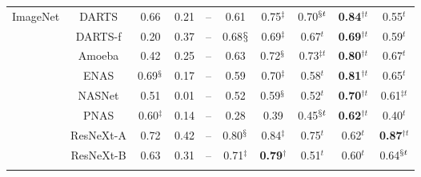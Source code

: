 \documentclass{article}
\begin{document}
\begin{table}[t]
{\begin{tabular}{lcccc|ccccc}
\hline

ImageNet & DARTS & 0.66 & 0.21 & -- &0.61 & {0.75$^\ddagger$} & {0.70$^{\mathsection t}$} & {\textbf{0.84$^{\dagger t}$}} & 0.55$^{t}$ \\
 & DARTS-f & 0.20 & 0.37 & --  &{0.68$\mathsection$} & {0.69$^\ddagger$} & 0.67$^{t}$ & {\textbf{0.69$^{\dagger t}$}} &  0.59$^{t}$ \\
 & Amoeba & 0.42 & 0.25 & -- & 0.63 & {0.72$^\mathsection$} & {0.73$^{\ddagger t}$} &  {\textbf{0.80$^{\dagger t}$}} & 0.67$^{t}$ \\
 & ENAS & {0.69$^\mathsection$} & 0.17 & -- &0.59 & {0.70$^\ddagger$} & 0.58$^{t}$ & {\textbf{0.81$^{\dagger t}$}} & {0.65$^{t}$} \\
 & NASNet & 0.51 & 0.01 & -- &0.52 &  {0.59$^\mathsection$} & 0.52$^{t}$ &  {\textbf{0.70$^{\dagger t}$}} & {0.61$^{\ddagger t}$} \\
 & PNAS & {0.60$^\ddagger$} & 0.14 & -- & 0.28 & 0.39 & {0.45$^{\mathsection t}$} & {\textbf{0.62$^{\dagger t}$}} & 0.40$^{t}$ \\
 & ResNeXt-A & 0.72 & 0.42 & -- & {0.80$^\mathsection$}& {0.84$^\ddagger$}& 0.75$^{t}$ & 0.62$^{t}$ & {\textbf{0.87$^{\dagger t}$}} \\
 & ResNeXt-B & 0.63 & 0.31 & -- & {0.71$^\ddagger$}& {\textbf{0.79}$^\dagger$} & 0.51$^{t}$ & 0.60$^{t}$ & {0.64$^{\mathsection t}$} \\
\Xhline{0.8pt}
\end{tabular}}
 \vspace{-14pt}
\end{table}
\normalsize{}


\vspace{-5pt}
\end{document}
